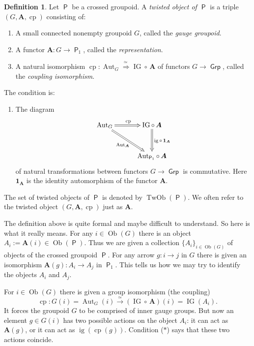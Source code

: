 \documentclass[a4paper, 10pt]{amsart}
\theoremstyle{definition}
\newtheorem{dfn}[equation]{Definition}
\numberwithin{equation}{section}
\newcommand{\iso}{\xrightarrow{\simeq}}
\newcommand{\opn}{\operatorname}
\newcommand{\cat}[1]{\operatorname{\mathsf{#1}}}
\newcommand{\rmitem}[1]{\item[\text{\textup{(#1)}}]}
\newcommand{\bsym}[1]{\boldsymbol{#1}}
\newcommand{\twoiso}{\stackrel{\simeq\ }{\Longrightarrow}}
\begin{document}
\begin{dfn} \label{dfn:6}
Let $\cat{P}$ be a crossed groupoid. A {\em twisted object of $\cat{P}$} is a
triple $(G, \bsym{A}, \opn{cp})$ consisting of:
\begin{enumerate}
\item A small connected nonempty groupoid $G$, called the {\em gauge groupoid}.
\item A functor
$\bsym{A} : G \to \cat{P}_1$, called the {\em representation}.
\item A natural isomorphism
$\opn{cp} : \opn{Aut}_{G} \twoiso \opn{IG} \circ \, \bsym{A}$
of functors $G \to \cat{Grp}$, called the  {\em
coupling isomorphism}.
\end{enumerate} 
The condition is: 
\begin{enumerate}
\rmitem{$*$} The diagram 
\[ \UseTips \xymatrix @C=7ex @R=7ex {
\opn{Aut}_{G}
\ar@{=>}[r]^{\opn{cp}}
\ar@{=>}[dr]_{\opn{Aut}_{\bsym{A}}}
& \opn{IG} \circ \, \bsym{A}
\ar@{=>}[d]^{\opn{ig} \circ \, \bsym{1}_{\bsym{A}}} \\
& \opn{Aut}_{\cat{P}_1} \circ \, \bsym{A}
} \]
of natural transformations
between functors $G \to \cat{Grp}$ is commutative. 
Here $\bsym{1}_{\bsym{A}}$ is the identity automorphism of the functor 
$\bsym{A}$.
\end{enumerate}
\end{dfn}

The set of twisted objects of $\cat{P}$ is
denoted by $\opn{TwOb}(\cat{P})$. 
We often refer to the twisted object 
$(G, \bsym{A}, \opn{cp})$ just as $\bsym{A}$.

The definition above is quite formal and maybe difficult to
understand. So here is what it really means. 
For any $i \in \opn{Ob} (G)$ there is an object
$A_i := \bsym{A}(i) \in \opn{Ob} (\cat{P})$. 
Thus we are given a collection 
$\{ A_i \}_{i \in \opn{Ob} (G)}$ of objects of the crossed groupoid $\cat{P}$.
For any arrow $g : i \to j$ in $G$ there is given an isomorphism 
$\bsym{A}(g) : A_i \to A_j$
in $\cat{P}_1$. This tells us how we may try to identify the objects
$A_i$ and $A_j$. 

For $i \in \opn{Ob} (G)$ there is given a group isomorphism (the coupling)
\[ \opn{cp} : G(i) = \opn{Aut}_{G}(i) \iso
(\opn{IG} \circ \, \bsym{A})(i) = \opn{IG}(A_i) . \]
It forces the groupoid $G$ to be comprised of inner gauge
groups. But now an element $g \in G(i)$ has two
possible actions on the object $A_i$: it can act as $\bsym{A}(g)$, or
it can act as $\opn{ig}(\opn{cp}(g))$. Condition ($*$) says that
these two actions coincide. 
\end{document}
